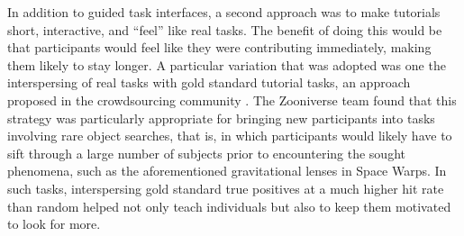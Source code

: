 \documentclass{sigchi}
\begin{document}
\begin{spacing}{0.97}
In addition to guided task interfaces, a second approach was to make tutorials short, interactive, and ``feel'' like real tasks. The benefit of doing this would be that participants would feel like they were contributing immediately, making them likely to stay longer. A particular variation that was adopted was one the interspersing of real tasks with gold standard tutorial tasks, an approach proposed in the crowdsourcing community \cite{Oleson2011Crowdflower}. The Zooniverse team found that this strategy was particularly appropriate for bringing new participants into tasks involving rare object searches, that is, in which participants would likely have to sift through a large number of subjects prior to encountering the sought phenomena, such as the aforementioned gravitational lenses in Space Warps. In such tasks, interspersing gold standard true positives at a much higher hit rate than random helped not only teach individuals but also to keep them motivated to look for more.






\end{spacing}
\end{document}
